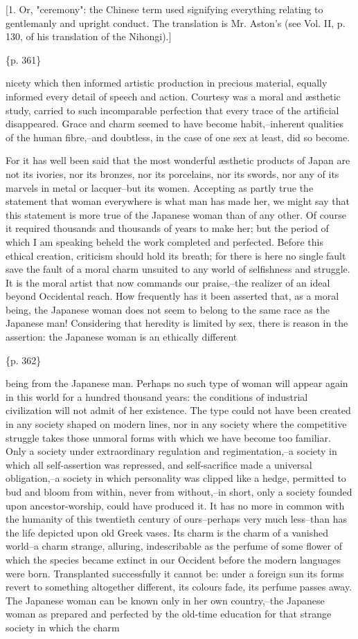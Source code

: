 [1. Or, "ceremony": the Chinese term used signifying everything relating to gentlemanly and upright conduct. The translation is Mr. Aston's (see Vol. II, p. 130, of his translation of the Nihongi).]

\{p. 361\}

nicety which then informed artistic production in precious material, equally informed every detail of speech and action. Courtesy was a moral and æsthetic study, carried to such incomparable perfection that every trace of the artificial disappeared. Grace and charm seemed to have become habit,--inherent qualities of the human fibre,--and doubtless, in the case of one sex at least, did so become.

For it has well been said that the most wonderful æsthetic products of Japan are not its ivories, nor its bronzes, nor its porcelains, nor its swords, nor any of its marvels in metal or lacquer--but its women. Accepting as partly true the statement that woman everywhere is what man has made her, we might say that this statement is more true of the Japanese woman than of any other. Of course it required thousands and thousands of years to make her; but the period of which I am speaking beheld the work completed and perfected. Before this ethical creation, criticism should hold its breath; for there is here no single fault save the fault of a moral charm unsuited to any world of selfishness and struggle. It is the moral artist that now commands our praise,--the realizer of an ideal beyond Occidental reach. How frequently has it been asserted that, as a moral being, the Japanese woman does not seem to belong to the same race as the Japanese man! Considering that heredity is limited by sex, there is reason in the assertion: the Japanese woman is an ethically different

\{p. 362\}

being from the Japanese man. Perhaps no such type of woman will appear again in this world for a hundred thousand years: the conditions of industrial civilization will not admit of her existence. The type could not have been created in any society shaped on modern lines, nor in any society where the competitive struggle takes those unmoral forms with which we have become too familiar. Only a society under extraordinary regulation and regimentation,--a society in which all self-assertion was repressed, and self-sacrifice made a universal obligation,--a society in which personality was clipped like a hedge, permitted to bud and bloom from within, never from without,--in short, only a society founded upon ancestor-worship, could have produced it. It has no more in common with the humanity of this twentieth century of ours--perhaps very much less--than has the life depicted upon old Greek vases. Its charm is the charm of a vanished world--a charm strange, alluring, indescribable as the perfume of some flower of which the species became extinct in our Occident before the modern languages were born. Transplanted successfully it cannot be: under a foreign sun its forms revert to something altogether different, its colours fade, its perfume passes away. The Japanese woman can be known only in her own country,--the Japanese woman as prepared and perfected by the old-time education for that strange society in which the charm

